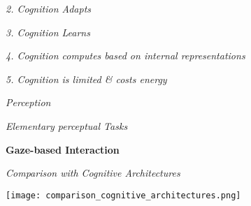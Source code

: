 \textit{2. Cognition Adapts} \smallskip


\textit{3. Cognition Learns} \smallskip

\textit{4. Cognition computes based on internal representations} \smallskip

\textit{5. Cognition is limited \& costs energy} \smallskip

\textit{Perception} \smallskip


\textit{Elementary perceptual Tasks} \smallskip


\textbf{Gaze-based Interaction} \smallskip


\textit{Comparison with Cognitive Architectures}


\begin{center}
	\texttt{[image: comparison\_cognitive\_architectures.png]}
\end{center}












